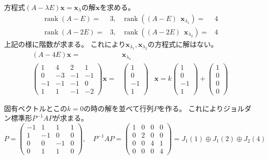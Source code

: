 \documentclass[12pt,b5paper]{ltjsarticle}
\newcommand{\Rnk}{\mathop{\mathrm{rank}}\nolimits}
\begin{document}
方程式$(A-\lambda E)\bm{x}=\bm{x}_{\lambda}$の解$\bm{x}$を求める。
\begin{align}
 \Rnk (A-E) =& 3, & \Rnk ((A-E) \ \ \bm{x}_{\lambda_1}) =& 4 \\
 \Rnk (A-2E) =& 3, & \Rnk ((A-2E) \ \ \bm{x}_{\lambda_2}) =& 4
\end{align}
上記の様に階数が求まる。
これにより$\bm{x}_{\lambda_1},\bm{x}_{\lambda_2}$の方程式に解はない。
\begin{align}
 (A-4E)\bm{x} =& \bm{x}_{\lambda_4}\\
 \begin{pmatrix}
  1 & 4 & 2 & 1\\
  0 & -3 & -1 & -1\\
  -1 & -1 & -1 & 0\\
  1 & 1 & -1 & -2
 \end{pmatrix}
 \bm{x}
 =&
 \begin{pmatrix} 1 \\ 0 \\ -1 \\ 1 \end{pmatrix}
 &
 \bm{x}=
 k\begin{pmatrix} 1 \\ 0 \\ -1 \\ 1 \end{pmatrix}
 +\begin{pmatrix} 1 \\ 0 \\ 0 \\ 0 \end{pmatrix}
\end{align}

固有ベクトルとこの$k=0$の時の解を並べて行列$P$を作る。
これによりジョルダン標準形$P^{-1}AP$が求まる。
\begin{equation}
 P=
 \begin{pmatrix}
  -1 & 1 & 1 & 1\\
  1 & -1 & 0 & 0\\
  0 & 0 & -1 & 0\\
  0 & 1 & 1 & 0
 \end{pmatrix}
 ,\quad
 P^{-1}AP=
 \begin{pmatrix}
  1 & 0 & 0 & 0\\
  0 & 2 & 0 & 0\\
  0 & 0 & 4 & 1\\
  0 & 0 & 0 & 4
 \end{pmatrix}
 =J_1(1) \oplus J_1(2) \oplus J_2(4)
\end{equation}
\end{document}
